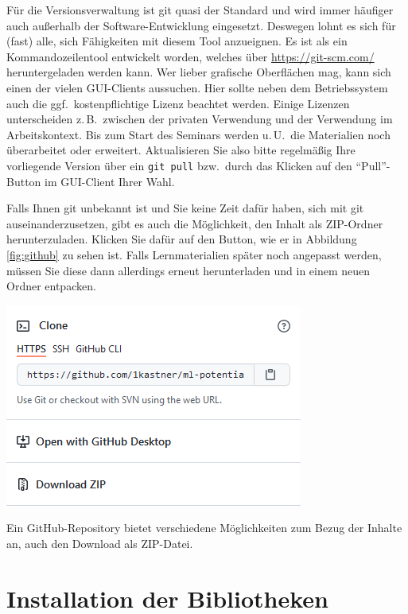 \documentclass[nobib]{tufte-handout}
\begin{document}
Für die Versionsverwaltung ist git quasi der Standard und wird immer häufiger auch außerhalb der Software-Entwicklung eingesetzt.
Deswegen lohnt es sich für (fast) alle, sich Fähigkeiten mit diesem Tool anzueignen.
Es ist als ein Kommandozeilentool entwickelt worden, welches über
\url{https://git-scm.com/}
heruntergeladen werden kann.
Wer lieber grafische Oberflächen mag, kann sich einen der vielen GUI-Clients%
aussuchen.
Hier sollte neben dem Betriebssystem auch die ggf.\ kostenpflichtige Lizenz beachtet werden.
Einige Lizenzen unterscheiden z.\,B.\ zwischen der privaten Verwendung und der Verwendung im Arbeitskontext.
Bis zum Start des Seminars werden u.\,U.\ die Materialien noch überarbeitet oder erweitert.
Aktualisieren Sie also bitte regelmäßig Ihre vorliegende Version über ein \texttt{git pull} bzw.\ durch das Klicken auf den \enquote{Pull}-Button im GUI-Client Ihrer Wahl.

Falls Ihnen git unbekannt ist und Sie keine Zeit dafür haben, sich mit git auseinanderzusetzen, gibt es auch die Möglichkeit, den Inhalt als ZIP-Ordner herunterzuladen.
Klicken Sie dafür auf den Button, wie er in Abbildung\,\ref{fig:github} zu sehen ist.
Falls Lernmaterialien später noch angepasst werden, müssen Sie diese dann allerdings erneut herunterladen und in einem neuen Ordner entpacken.

\begin{marginfigure}
  \includegraphics{github-zip}
  \caption{Ein GitHub-Repository bietet verschiedene Möglichkeiten zum Bezug der Inhalte an, auch den Download als ZIP-Datei.}%
\label{fig:github}
\end{marginfigure}


\section{Installation der Bibliotheken}
\end{document}
